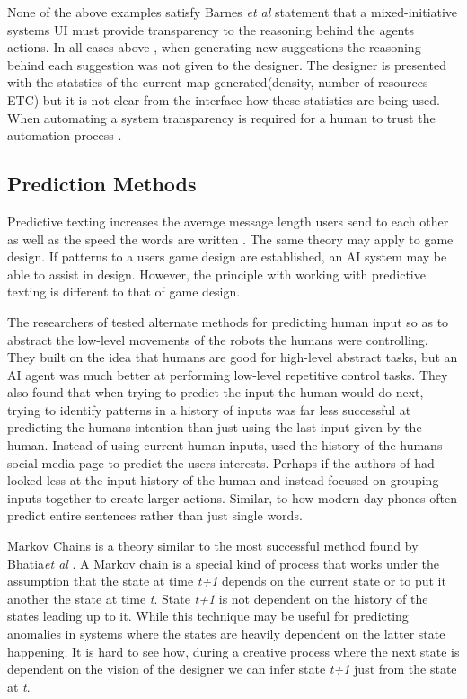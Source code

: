 \documentclass[journal]{IEEEtran}
\begin{document}
None of the above examples \cite{alvarez2018fostering, liapis2013sentient, baldwin2017mixed} satisfy  Barnes \textit{et al}\cite{barnes2015designing} statement that a mixed-initiative systems UI must provide transparency to the reasoning behind the agents actions. In all cases above\cite{alvarez2018fostering, liapis2013sentient, baldwin2017mixed} , when generating new suggestions the reasoning behind each suggestion was not given to the designer. The designer is presented with the statstics of the current map generated(density, number of resources ETC) but it is not clear from the interface how these statistics are being used. When automating a system transparency is required for a human to trust the automation process \cite{lee2004trust}.

\subsection{Prediction Methods} \label{prediction}
Predictive texting increases the average message length users send to each other \cite{ling2005length} as well as the speed the words are written \cite{dunlop2000predictive}. The same theory may apply to game design. If patterns to a users game design are established, an AI system may be able to assist in design. However, the principle with working with predictive texting is different to that of game design.

The researchers of \cite{chipalkatty2013less} tested alternate methods for predicting human input so as to abstract the low-level movements of the robots the humans were controlling. They built on the idea that humans are good for high-level abstract tasks, but an AI agent was much better at performing low-level repetitive control tasks. They also found that when trying to predict the input the human would do next, trying to identify patterns in a history of inputs was far less successful at predicting the humans intention than just using the last input given by the human. Instead of using current human inputs, \cite{bhatia2016targeted} used the history of the humans social media page to predict the users interests. Perhaps if the authors of \cite{chipalkatty2013less} had looked less at the input history of the human and instead focused on grouping inputs together to create larger actions. Similar, to how modern day phones often predict entire sentences rather than just single words.

Markov Chains is a theory similar to the most successful method found by Bhatia\textit{et al} \cite{bhatia2016targeted}. A Markov chain is a special kind of process that works under the assumption that  the state at time \textit{t+1} depends on the current state or to put it another the state at time \textit{t}. State \textit{t+1}  is not dependent on the history of the states leading up to it\cite{ye2000markov}. While this technique may be useful for predicting anomalies in systems \cite{ju2001hybrid, gwadera2005markov, ye2000markov} where the states are heavily dependent on the latter state happening. It is hard to see how, during a creative process where the next state is dependent on the vision of the designer we can infer state \textit{t+1} just from the state at \textit{t}. 
\end{document}
